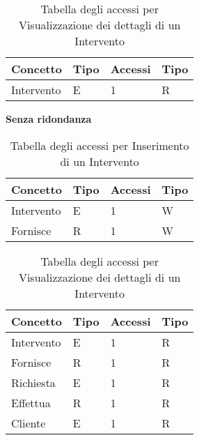 \documentclass{article}
\begin{document}
\begin{table}[h]
    \centering
        \begin{adjustbox}{width=0.6\textwidth}
            \begin{tabular}{|m{2cm}|m{2cm}|m{2cm}|m{2cm}|}
                \hline  
                \textbf{Concetto} & \textbf{Tipo} & \textbf{Accessi} & \textbf{Tipo}\\ 
                \hline
                Intervento & E & 1 & R\\
                \hline
            \end{tabular}
        \end{adjustbox}
    \caption{Tabella degli accessi per Visualizzazione dei dettagli di un Intervento}
    \label{tab:accesstable}
\end{table}

\textbf{Senza ridondanza}

\begin{table}[h]
    \centering
        \begin{adjustbox}{width=0.6\textwidth}
            \begin{tabular}{|m{2cm}|m{2cm}|m{2cm}|m{2cm}|}
                \hline  
                \textbf{Concetto} & \textbf{Tipo} & \textbf{Accessi} & \textbf{Tipo} \\ 
                \hline
                Intervento & E & 1 & W \\
                \hline
                Fornisce & R & 1 & W \\
                \hline
            \end{tabular}
        \end{adjustbox}
    \caption{Tabella degli accessi per Inserimento di un Intervento}
    \label{tab:accesstable}
\end{table}

\begin{table}[h!]
    \centering
        \begin{adjustbox}{width=0.6\textwidth}
            \begin{tabular}{|m{2cm}|m{2cm}|m{2cm}|m{2cm}|}
                \hline  
                \textbf{Concetto} & \textbf{Tipo} & \textbf{Accessi} & \textbf{Tipo} \\ 
                \hline
                Intervento & E & 1 & R \\
                \hline
                Fornisce & R & 1 & R \\
                \hline
                Richiesta & E & 1 & R \\
                \hline
                Effettua & R & 1 & R \\
                \hline
                Cliente & E & 1 & R \\
                \hline
            \end{tabular}
        \end{adjustbox}
    \caption{Tabella degli accessi per Visualizzazione dei dettagli di un Intervento}
    \label{tab:accesstable}
\end{table}
\end{document}
